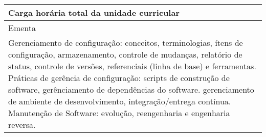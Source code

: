 \begin{quadro}[ht!]
\begin{tabular}{|p{3cm} p{2cm} p{3cm} p{2cm} p{3cm} p{2cm}|}
\multicolumn{5}{|p{13cm}|}{\cellcolor{blue1} Carga horária total da unidade curricular} & \multicolumn{1}{p{1cm}|}{\raggedleft 60	}\\\hline
\multicolumn{6}{|p{15cm}|}{\cellcolor{blue1} Ementa} \\\hline
\hline\multicolumn{6}{|p{15cm}|}{\scriptsize Gerenciamento de configuração: conceitos, terminologias, ítens de configuração, armazenamento, controle de mudanças, relatório de status, controle de versões, referenciais (linha de base) e ferramentas. Práticas de gerência de configuração: scripts de construção de software, gerênciamento de dependências do software. gerenciamento de ambiente de desenvolvimento, integração/entrega contínua. Manutenção de Software: evolução, reengenharia e engenharia reversa.}\\\hline
\hline
	\end{tabular}
\end{quadro}
\clearpage
